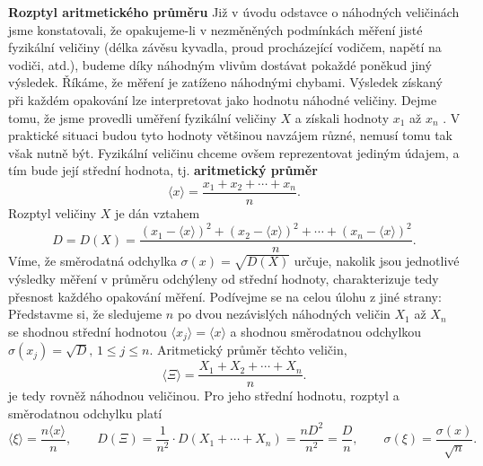 \wikitextrule
\begin{example}\label{mai:exam073}
  \textbf{Rozptyl aritmetického průměru}\newline\small
  Již v úvodu odstavce o náhodných veličinách jsme konstatovali, že opakujeme-li v nezměněných 
  podmínkách měření jisté fyzikální veličiny (délka závěsu kyvadla, proud procházející vodičem, 
  napětí na vodiči, atd.), budeme díky náhodným vlivům dostávat pokaždé poněkud jiný výsledek. 
  Říkáme, že měření je zatíženo náhodnými chybami. Výsledek získaný při každém opakování lze 
  interpretovat jako hodnotu náhodné veličiny. Dejme tomu, že jsme provedli uměření fyzikální 
  veličiny \(X\) a získali hodnoty \(x_1\) až \(x_n\) . V praktické situaci budou tyto hodnoty
  většinou navzájem různé, nemusí tomu tak však nutně být. Fyzikální veličinu chceme ovšem 
  reprezentovat jediným údajem, a tím bude její střední hodnota, tj. \textbf{aritmetický průměr}
  \begin{equation*}
    \langle x \rangle = \dfrac{x_1 + x_2 + \cdots + x_n}{n}.
  \end{equation*}
  Rozptyl veličiny \(X\) je dán vztahem
  \begin{equation*}
    D = D(X) = \dfrac{\left(x_1 - \langle x \rangle\right)^2 + 
                      \left(x_2 - \langle x \rangle\right)^2 + \cdots +
                      \left(x_n - \langle x \rangle\right)^2}{n}.
  \end{equation*}
  Víme, že směrodatná odchylka \(\sigma( x ) = \sqrt{D(X)}\) určuje, nakolik jsou jednotlivé 
  výsledky měření v průměru odchýleny od střední hodnoty, charakterizuje tedy přesnost každého 
  opakování měření. Podívejme se na celou úlohu z jiné strany: Představme si, že sledujeme \(n\) po 
  dvou nezávislých náhodných veličin \(X_1\) až \(X_n\) se shodnou střední hodnotou \(\langle x_j 
  \rangle = \langle x \rangle\) a shodnou směrodatnou odchylkou \(\sigma(x_j) = \sqrt{D},\, 1 \leq 
  j \leq n\). Aritmetický průměr těchto veličin,
  \begin{equation*}
    \langle \Xi \rangle = \dfrac{X_1 + X_2 + \cdots + X_n}{n}.
  \end{equation*}
  je tedy rovněž náhodnou veličinou. Pro jeho střední hodnotu, rozptyl a směrodatnou odchylku platí
  \begin{equation*}
    \langle \xi \rangle = \dfrac{n\langle x \rangle}{n}, \qquad
    D(\Xi) = \dfrac{1}{n^2}\cdot D(X_1 + \cdots + X_n) = \dfrac{nD^2}{n^2} = \dfrac{D}{n}, \qquad
    \sigma(\xi) = \dfrac{\sigma(x)}{\sqrt{n}}.
  \end{equation*}
\normalsize
\end{example}